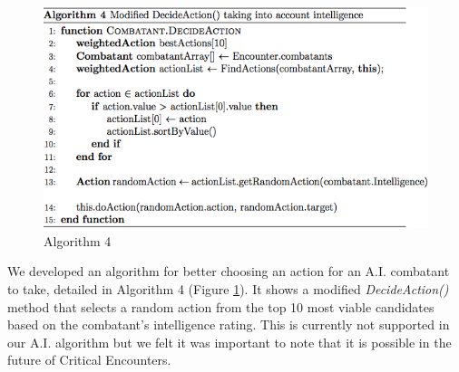 \documentclass[letterpaper, 10 pt, conference]{ieeeconf}
\begin{document}
\begin{figure}[H]
	\centering
	\centerline{\includegraphics[scale=.37]{algorithm_4}}
	\caption{Algorithm 4}
	\label{fig: Algorithm 4}
\end{figure}

We developed an algorithm for better choosing an action for an A.I. combatant to take, detailed in Algorithm 4 (Figure \ref{fig: Algorithm 4}). It shows a modified\textit{ DecideAction()} method that selects a random
action from the top 10 most viable candidates based on the combatant’s intelligence
rating. This is currently not supported in our A.I. algorithm but we felt it was important to note that it is possible in the future of Critical Encounters.
\end{document}
